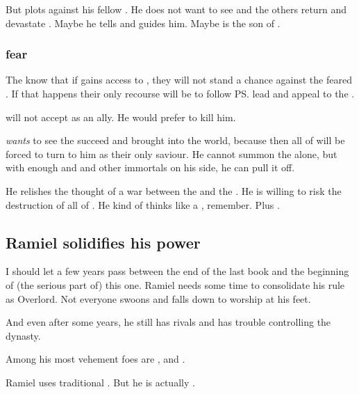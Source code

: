 But \Iurzmacul{} plots against his fellow \firstgendragons{}. He does not want to see \Tiamat{} and the others return and devastate \Miith{}. Maybe he tells \Ishnaruchaefir{} and guides him. Maybe \Ishnaruchaefir{} is the son of \Iurzmacul.





\subsubsection{\Dragons fear \Voidbringer}
The \dragons{} know that if \Voidbringer{} gains access to \Miith, they will not stand a chance against the feared \baneking. 
If that happens their only recourse will be to follow \ps{\Vizsherioch} lead and appeal to the \xss. 

\Vizsherioch{} will not accept \Ishnaruchaefir{} as an ally. 
He would prefer to kill him. 

\Vizsherioch{} \emph{wants} to see the \banes{} succeed and \Voidbringer{} brought into the world, because then all of \Miith{} will be forced to turn to him as their only saviour. 
He cannot summon the \xss{} alone, but with enough \dragons{} and \quiljaaran{} and other immortals on his side, he can pull it off. 

He relishes the thought of a war between the \xss{} and the \banelords. 
He is willing to risk the destruction of all of \Miith. 
He kind of thinks like a \xss, remember. 
Plus . 









\subsection{Ramiel solidifies his power}
I should let a few years pass between the end of the last book and the beginning of (the serious part of) this one. 
Ramiel needs some time to consolidate his rule as Overlord. 
Not everyone swoons and falls down to worship at his feet. 

And even after some years, he still has rivals and has trouble controlling the dynasty. 

Among his most vehement foes are , \Sargamel and \Themirod. 

Ramiel uses traditional \Mystraacht {}. 
But he is actually . 

